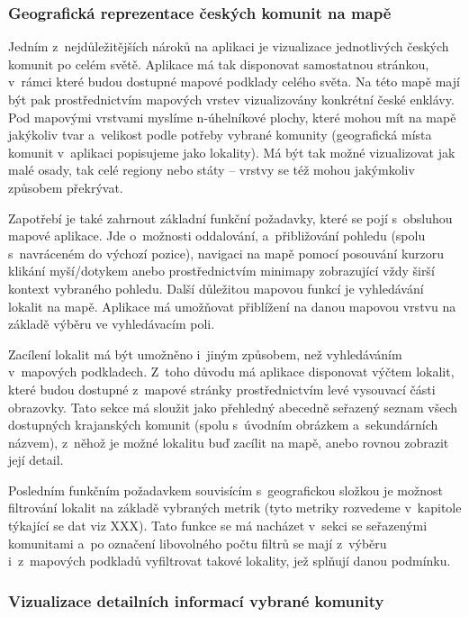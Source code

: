 \hypertarget{geografickuxe1-reprezentace-ux10deskuxfdch-komunit-na-mapux11b}{%
\subsubsection{Geografická reprezentace českých komunit na mapě}\label{geografickuxe1-reprezentace-ux10deskuxfdch-komunit-na-mapux11b}}

Jedním z~nejdůležitějších nároků na aplikaci je vizualizace jednotlivých českých komunit po celém světě. Aplikace má tak disponovat samostatnou stránkou, v~rámci které budou dostupné mapové podklady celého světa. Na této mapě mají být pak prostřednictvím mapových vrstev vizualizovány konkrétní české enklávy. Pod mapovými vrstvami myslíme n-úhelníkové plochy, které mohou mít na mapě jakýkoliv tvar a~velikost podle potřeby vybrané komunity (geografická místa komunit v~aplikaci popisujeme jako lokality). Má být tak možné vizualizovat jak malé osady, tak celé regiony nebo státy -- vrstvy se též mohou jakýmkoliv způsobem překrývat.

Zapotřebí je také zahrnout základní funkční požadavky, které se pojí s~obsluhou mapové aplikace. Jde o~možnosti oddalování, a~přibližování pohledu (spolu s~navráceném do výchozí pozice), navigaci na mapě pomocí posouvání kurzoru klikání myší/dotykem anebo prostřednictvím minimapy zobrazující vždy širší kontext vybraného pohledu. Další důležitou mapovou funkcí je vyhledávání lokalit na mapě. Aplikace má umožňovat přiblížení na danou mapovou vrstvu na základě výběru ve vyhledávacím poli.

Zacílení lokalit má být umožněno i~jiným způsobem, než vyhledáváním v~mapových podkladech. Z~toho důvodu má aplikace disponovat výčtem lokalit, které budou dostupné z~mapové stránky prostřednictvím levé vysouvací části obrazovky. Tato sekce má sloužit jako přehledný abecedně seřazený seznam všech dostupných krajanských komunit (spolu s~úvodním obrázkem a~sekundárních názvem), z~něhož je možné lokalitu buď zacílit na mapě, anebo rovnou zobrazit její detail.

Posledním funkčním požadavkem souvisícím s~geografickou složkou je možnost filtrování lokalit na základě vybraných metrik (tyto metriky rozvedeme v~kapitole týkající se dat viz XXX). Tato funkce se má nacházet v~sekci se seřazenými komunitami a~po označení libovolného počtu filtrů se mají z~výběru i~z~mapových podkladů vyfiltrovat takové lokality, jež splňují danou podmínku.

\hypertarget{vizualizace-detailnuxedch-informacuxed-vybranuxe9-komunity}{%
\subsubsection{Vizualizace detailních informací vybrané komunity}\label{vizualizace-detailnuxedch-informacuxed-vybranuxe9-komunity}}

